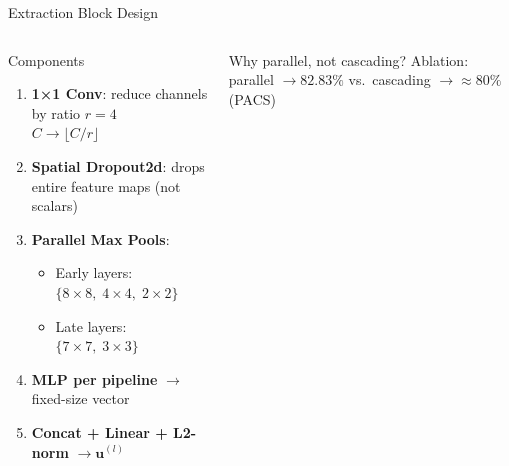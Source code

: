 \documentclass[aspectratio=169,10pt]{beamer}
\begin{document}
\begin{frame}{Extraction Block Design}
\begin{columns}[T]
      \begin{block}{Components}
        \begin{enumerate}
          \item \textbf{1×1 Conv}: reduce channels by ratio $r{=}4$\\
                $C \to \lfloor C/r \rfloor$
          \item \textbf{Spatial Dropout2d}: drops entire feature maps (not scalars)
          \item \textbf{Parallel Max Pools}:
                \begin{itemize}
                  \item Early layers: $\{8{\times}8,\;4{\times}4,\;2{\times}2\}$
                  \item Late layers: $\{7{\times}7,\;3{\times}3\}$
                \end{itemize}
          \item \textbf{MLP per pipeline} $\to$ fixed-size vector
          \item \textbf{Concat + Linear + L2-norm} $\to \mathbf{u}^{(l)}$
        \end{enumerate}
      \end{block}

      \vspace{0.3em}
      \begin{alertblock}{Why parallel, not cascading?}
        Ablation: parallel $\to 82.83\%$ vs.\ cascading $\to \approx80\%$ (PACS)
      \end{alertblock}
  \end{columns}
\end{frame}
\end{document}

